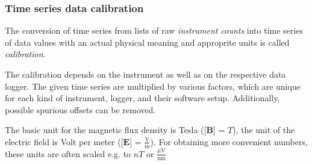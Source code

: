 \subsubsection{Time series data calibration}

The conversion of  time series from lists of raw \textit{instrument counts} into time series of data values with an actual physical meaning and approprite units is called \textit{calibration}.

The calibration depends on  the instrument as well as on the respective data logger. The given time series are multiplied by various factors, which are unique for each kind of instrument,  logger, and their software setup. Additionally, possible spurious offsets can be removed.

The basic unit for the magnetic flux density is Tesla ([$\mathbf{B}$] = $T$), the unit of the electric field is Volt per meter ([$\mathbf{E}$] = $\frac{\mbox{V}}{\mbox{m}}$). For obtaining more convenient numbers, these units are often scaled e.g. to $nT$ or $\frac{\mu\mbox{V}}{\mbox{nm}}$





